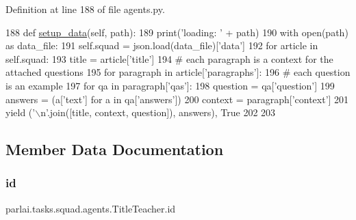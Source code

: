 Definition at line 188 of file agents.\+py.


\begin{DoxyCode}
188     \textcolor{keyword}{def }\hyperlink{namespaceparlai_1_1tasks_1_1multinli_1_1agents_a4fa2cb0ba1ed745336ad8bceed36b841}{setup\_data}(self, path):
189         print(\textcolor{stringliteral}{'loading: '} + path)
190         with open(path) \textcolor{keyword}{as} data\_file:
191             self.squad = json.load(data\_file)[\textcolor{stringliteral}{'data'}]
192         \textcolor{keywordflow}{for} article \textcolor{keywordflow}{in} self.squad:
193             title = article[\textcolor{stringliteral}{'title'}]
194             \textcolor{comment}{# each paragraph is a context for the attached questions}
195             \textcolor{keywordflow}{for} paragraph \textcolor{keywordflow}{in} article[\textcolor{stringliteral}{'paragraphs'}]:
196                 \textcolor{comment}{# each question is an example}
197                 \textcolor{keywordflow}{for} qa \textcolor{keywordflow}{in} paragraph[\textcolor{stringliteral}{'qas'}]:
198                     question = qa[\textcolor{stringliteral}{'question'}]
199                     answers = (a[\textcolor{stringliteral}{'text'}] \textcolor{keywordflow}{for} a \textcolor{keywordflow}{in} qa[\textcolor{stringliteral}{'answers'}])
200                     context = paragraph[\textcolor{stringliteral}{'context'}]
201                     \textcolor{keywordflow}{yield} (\textcolor{stringliteral}{'\(\backslash\)n'}.join([title, context, question]), answers), \textcolor{keyword}{True}
202 
203 
\end{DoxyCode}


\subsection{Member Data Documentation}
\mbox{\label{classparlai_1_1tasks_1_1squad_1_1agents_1_1TitleTeacher_afc29efc5cf9c9800f0cb5d9346b48f61}} 
\subsubsection{\texorpdfstring{id}{id}}
{\footnotesize\ttfamily parlai.\+tasks.\+squad.\+agents.\+Title\+Teacher.\+id}



